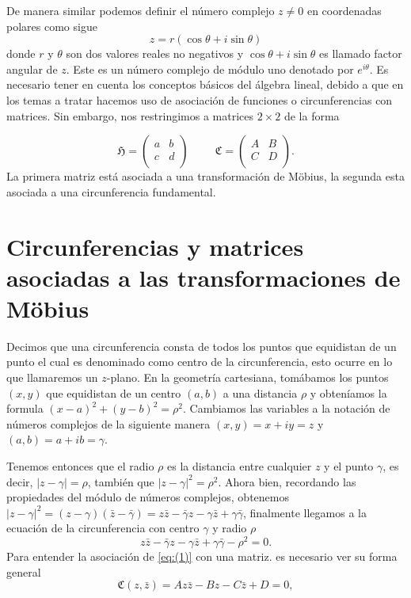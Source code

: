 \documentclass{matematicasud}
\begin{document}
De manera similar podemos definir el número complejo $z \neq 0$ en coordenadas polares como sigue
$$z = r(\cos{\theta} + i\sin{\theta})$$
donde $r$ y $\theta$ son dos valores reales no negativos y $\cos{\theta} + i \sin{\theta}$ es llamado factor angular de $z$. Este es un número complejo de módulo uno denotado por $e^{i\theta}$. Es necesario tener en cuenta los conceptos básicos del álgebra lineal, debido a que en los temas a tratar hacemos uso de asociación de funciones o circunferencias con matrices. Sin embargo, nos restringimos a matrices $2 \times 2$ de la forma

\begin{equation*}
    \mathfrak{H} = 
    \begin{pmatrix}
        a & b \\
        c & d \\
    \end{pmatrix}
    \hspace{1cm}
    \mathfrak{C} =
    \begin{pmatrix}
        A & B\\
        C & D\\
    \end{pmatrix}.
\end{equation*}
La primera matriz está asociada a una transformación de Möbius, la segunda esta asociada a una circunferencia fundamental.

\newpage

\section{Circunferencias y matrices asociadas a las transformaciones de Möbius}\label{cap:2}

Decimos que una circunferencia consta de todos los puntos que equidistan de un punto el cual es denominado como centro de la circunferencia, esto ocurre en lo que llamaremos un $z$-plano. En la geometría cartesiana, tomábamos los puntos $(x,y)$ que equidistan de un centro $(a,b)$ a una distancia $\rho$ y obteníamos la formula $(x-a)^2+(y-b)^2 = \rho^2$. Cambiamos las variables a la notación de números complejos de la siguiente manera $(x,y)=x+iy=z$ y $(a,b) = a + ib =\gamma$.

Tenemos entonces que el radio $\rho$ es la distancia entre cualquier $z$ y el punto $\gamma$, es decir, $|z-\gamma|=\rho$, también que $|z-\gamma|^2=\rho^2$. Ahora bien, recordando las propiedades del módulo de números complejos, obtenemos $|z-\gamma|^2=(z-\gamma)(\bar{z}-\bar{\gamma})=z\bar{z}-\bar{\gamma}z-\gamma\bar{z}+\gamma\bar{\gamma}$, finalmente llegamos a la ecuación de la circunferencia con centro $\gamma$ y radio $\rho$
\begin{equation}
    z\bar{z}-\bar{\gamma}z-\gamma\bar{z}+\gamma\bar{\gamma}-\rho^2=0.
    \label{eq:(1)}
\end{equation}
Para entender la asociación de \eqref{eq:(1)} con una matriz. es necesario ver su forma general
\begin{equation}
    \mathfrak{C}(z,\bar{z})=Az\bar{z}-Bz-C\bar{z}+D=0,
    \label{eq:(2)}
\end{equation}
\end{document}
